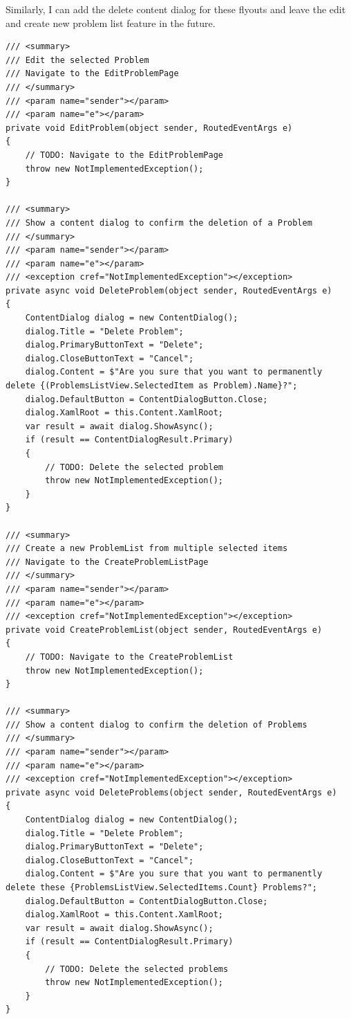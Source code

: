 \documentclass[a4paper]{report}
\begin{document}
Similarly, I can add the delete content dialog for these flyouts and leave the edit and create new problem list feature in the future.

\begin{verbatim}
/// <summary>
/// Edit the selected Problem
/// Navigate to the EditProblemPage
/// </summary>
/// <param name="sender"></param>
/// <param name="e"></param>
private void EditProblem(object sender, RoutedEventArgs e)
{
    // TODO: Navigate to the EditProblemPage
    throw new NotImplementedException();
}

/// <summary>
/// Show a content dialog to confirm the deletion of a Problem
/// </summary>
/// <param name="sender"></param>
/// <param name="e"></param>
/// <exception cref="NotImplementedException"></exception>
private async void DeleteProblem(object sender, RoutedEventArgs e)
{
    ContentDialog dialog = new ContentDialog();
    dialog.Title = "Delete Problem";
    dialog.PrimaryButtonText = "Delete";
    dialog.CloseButtonText = "Cancel";
    dialog.Content = $"Are you sure that you want to permanently delete {(ProblemsListView.SelectedItem as Problem).Name}?";
    dialog.DefaultButton = ContentDialogButton.Close;
    dialog.XamlRoot = this.Content.XamlRoot;
    var result = await dialog.ShowAsync();
    if (result == ContentDialogResult.Primary)
    {
        // TODO: Delete the selected problem
        throw new NotImplementedException();
    }
}

/// <summary>
/// Create a new ProblemList from multiple selected items
/// Navigate to the CreateProblemListPage
/// </summary>
/// <param name="sender"></param>
/// <param name="e"></param>
/// <exception cref="NotImplementedException"></exception>
private void CreateProblemList(object sender, RoutedEventArgs e)
{
    // TODO: Navigate to the CreateProblemList
    throw new NotImplementedException();
}

/// <summary>
/// Show a content dialog to confirm the deletion of Problems
/// </summary>
/// <param name="sender"></param>
/// <param name="e"></param>
/// <exception cref="NotImplementedException"></exception>
private async void DeleteProblems(object sender, RoutedEventArgs e)
{
    ContentDialog dialog = new ContentDialog();
    dialog.Title = "Delete Problem";
    dialog.PrimaryButtonText = "Delete";
    dialog.CloseButtonText = "Cancel";
    dialog.Content = $"Are you sure that you want to permanently delete these {ProblemsListView.SelectedItems.Count} Problems?";
    dialog.DefaultButton = ContentDialogButton.Close;
    dialog.XamlRoot = this.Content.XamlRoot;
    var result = await dialog.ShowAsync();
    if (result == ContentDialogResult.Primary)
    {
        // TODO: Delete the selected problems
        throw new NotImplementedException();
    }
}
\end{verbatim}
\end{document}
